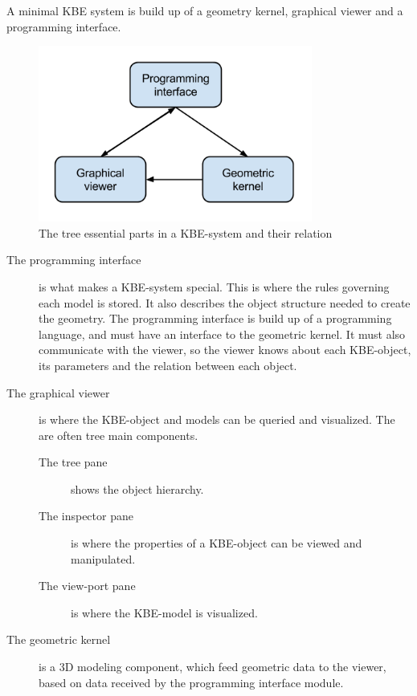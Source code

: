 \begin{mydef}
  A minimal KBE system is build up of a geometry kernel, graphical viewer and a programming interface.
\end{mydef}

\begin{figure}[ht!]
\centering
\includegraphics[width=90mm]{gfx/kbe_system_in_3_parts.png}

\caption{The tree essential parts in a KBE-system and their relation}
\label{fig:3parts}
\end{figure}

\begin{description}
  \item[The programming interface] is what makes a KBE-system special. This is where the rules governing each model is stored. It also describes the object structure needed to create the geometry. The programming interface is build up of a programming language, and must have an interface to the geometric kernel. It must also communicate with the viewer, so the viewer knows about each KBE-object, its parameters and the relation between each object.
  \item[The graphical viewer] is where the KBE-object and models can be queried and visualized. The are often tree main components.
  \begin{description}
    \item[The tree pane] shows the object hierarchy.
    \item[The inspector pane] is where the properties of a KBE-object can be viewed and manipulated.
    \item[The view-port pane] is where the KBE-model is visualized.
  \end{description}
  \item[The geometric kernel] is a 3D modeling component, which feed geometric data to the viewer, based on data received by the programming interface module.
\end{description}

